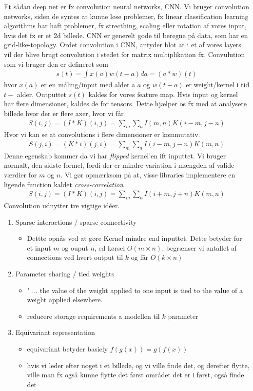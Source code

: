 \documentclass[paper=a4, fontsize=11pt]{scrartcl} %
\numberwithin{equation}{section} %
\numberwithin{figure}{section} %
\numberwithin{table}{section} %
\begin{document}
	Et sådan deep net er fx convolution neural networks, CNN. Vi bruger convolution networks, siden de syntes at kunne løse problemer, fx linear classification learning algorithms har haft problemer, fx strecthing, scaling eller rotation af vores input, hvis det fx er et 2d billede. CNN er generelt gode til beregne på data, som har en grid-like-topology. Ordet convolution i CNN, antyder blot at i et af vores layers vil der blive brugt convolution i stedet for matrix multiplikation fx. Convulution som vi bruger den er defineret som
	\begin{align*}
	s(t)=\int x(a)w(t-a)da=(a\ast w)(t)
	\end{align*}
	hvor $x(a)$ er en måling/input med alder a $a$ og $w(t-a)$ er weight/kernel i tid $t -$ alder. Outputtet $s(t)$ kaldes for vores feature map. Hvis input og kernel har flere dimensioner, kaldes de for tensors. Dette hjælper os fx med at analysere billede hvor der er flere axer, hvor vi får
	\begin{align*}
	S(i,j)=(I\ast K)(i,j)=\sum_m \sum_n I(m,n)K(i-m,j-n) 
	\end{align*}
	Hvor vi kan se at convolutions i flere dimensioner er kommutativ. 
	\begin{align*}
	S(j,i)=(K\ast i)(j,i)=\sum_m \sum_n I(i-m,j-n)K(m,n) 
	\end{align*}
	Denne egenskab kommer da vi har \textit{flipped} kernel'en ift inputtet. Vi bruger normalt, den sidste formel, fordi der er mindre variation i mængden af valide værdier for $m$ og $n$. Vi gør opmærksom på at, visse libraries implementere en ligende function kaldet \textit{cross-correlation}
	\begin{align*}
	S(i,j)=(I\ast K)(i,j)=\sum_m \sum_n I(i+m,j+n)K(m,n)
	\end{align*}
	Convolution udnytter tre vigtige idéer.
	\begin{enumerate}
		\item Sparse interactions / sparse connectivity
		\begin{itemize}
			\item Dettte opnås ved at gøre Kernel mindre end inputtet. Dette betyder for et input $m$ og ouput $n$, ed kørsel $O(m\times n)$, begrænser vi antallet af connections ved hvert output til $k$ og får $O(k\times n)$
		\end{itemize}
		\item Parameter sharing / tied weights
		\begin{itemize}
			\item " ... the value of the weight applied to one input is tied to the value of a  weight applied elsewhere.
			\item reducere storage requirements a modellen til $k$ parameter
		\end{itemize}
		\item Equivariant representation
		\begin{itemize}
			\item equivariant betyder basicly $f(g(x))=g(f(x))$
			\item hvis vi leder efter noget i et billede, og vi ville finde det, og derefter flytte, ville man fx også kunne flytte det først området det er i først, også finde det
		\end{itemize}
	\end{enumerate}
\end{document}
